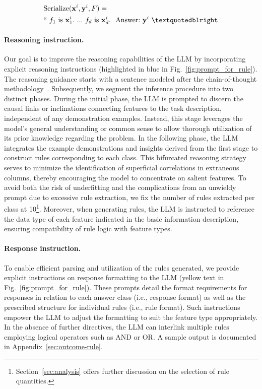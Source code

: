 \begin{align}
&\text{Serialize}(\mathbf{x}^i,\mathbf{y}^i, F) = \nonumber \\ 
&``\ f_1\ \text{is}\ \mathbf{x}^i_1.\ ... \ f_d\  \text{is}\  \mathbf{x}^i_d.\ \ \text{Answer:}\  \mathbf{y}^i\ ”
\end{align}

\vspace*{-0.12in}
\paragraph{Reasoning instruction.} Our goal is to improve the reasoning capabilities of the LLM by incorporating explicit reasoning instructions (highlighted in blue in Fig.~\ref{fig:prompt_for_rule}). The reasoning guidance starts with a sentence modeled after the chain-of-thought methodology~\cite{wei2022chain}. Subsequently, we segment the inference procedure into two distinct phases. During the initial phase, the LLM is prompted to discern the causal links or inclinations connecting features to the task description, independent of any demonstration examples. Instead, this stage leverages the model's general understanding or common sense to allow thorough utilization of its prior knowledge regarding the problem. In the following phase, the LLM integrates the example demonstrations and insights derived from the first stage to construct rules corresponding to each class. This bifurcated reasoning strategy serves to minimize the identification of superficial correlations in extraneous columns, thereby encouraging the model to concentrate on salient features. To avoid both the risk of underfitting and the complications from an unwieldy prompt due to excessive rule extraction, we fix the number of rules extracted per class at 10\footnote{Section~\ref{sec:analysis} offers further discussion on the selection of rule quantities.}. Moreover, when generating rules, the LLM is instructed to reference the data type of each feature indicated in the basic information description, ensuring compatibility of rule logic with feature types.

\vspace*{-0.12in}
\paragraph{Response instruction.} To enable efficient parsing and utilization of the rules generated, we provide explicit instructions on response formatting to the LLM (yellow text in Fig.~\ref{fig:prompt_for_rule}). These prompts detail the format requirements for responses in relation to each answer class (i.e., response format) as well as the prescribed structure for individual rules (i.e., rule format). Such instructions empower the LLM to adjust the formatting to suit the feature type appropriately. In the absence of further directives, the LLM can interlink multiple rules employing logical operators such as AND or OR. A sample output is documented in Appendix~\ref{sec:outcome-rule}.

